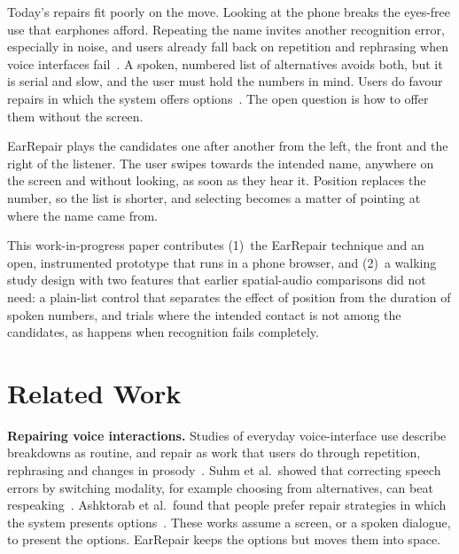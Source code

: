 \documentclass[conference,letterpaper]{IEEEtran}
\begin{document}
Today's repairs fit poorly on the move. Looking at the phone breaks the eyes-free use that earphones
afford. Repeating the name invites another recognition error, especially in noise, and users already
fall back on repetition and rephrasing when voice interfaces fail~\cite{myers2018patterns,
beneteau2019communication}. A spoken, numbered list of alternatives avoids both, but it is serial and
slow, and the user must hold the numbers in mind. Users do favour repairs in which the system offers
options~\cite{ashktorab2019resilient}. The open question is how to offer them without the screen.

EarRepair plays the candidates one after another from the left, the front and the right of the
listener. The user swipes towards the intended name, anywhere on the screen and without looking, as
soon as they hear it. Position replaces the number, so the list is shorter, and selecting becomes a
matter of pointing at where the name came from.

This work-in-progress paper contributes (1)~the EarRepair technique and an open, instrumented
prototype that runs in a phone browser, and (2)~a walking study design with two features that earlier
spatial-audio comparisons did not need: a plain-list control that separates the effect of position
from the duration of spoken numbers, and trials where the intended contact is not among the
candidates, as happens when recognition fails completely.

\section{Related Work}
\textbf{Repairing voice interactions.} Studies of everyday voice-interface use describe breakdowns as
routine, and repair as work that users do through repetition, rephrasing and changes in
prosody~\cite{porcheron2018voice,myers2018patterns,beneteau2019communication}. Suhm et al.\ showed that
correcting speech errors by switching modality, for example choosing from alternatives, can beat
respeaking~\cite{suhm2001multimodal}. Ashktorab et al.\ found that people prefer repair strategies in
which the system presents options~\cite{ashktorab2019resilient}. These works assume a screen, or a
spoken dialogue, to present the options. EarRepair keeps the options but moves them into space.
\end{document}
